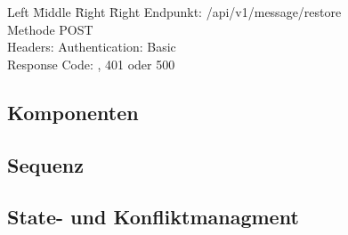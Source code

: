\begin{tabbing}
    Left \= Middle \= Right \= Right \kill
    Endpunkt:  \> \> \> /api/v1/message/restore\\
    Methode \>  \> \> POST\\
    Headers:  \> \>   \> Authentication: Basic\\
    Response Code:  \> \>  , 401 oder 500 \\
\end{tabbing}

\clearpage

\subsection{Komponenten}

\clearpage

\subsection{Sequenz}

\clearpage

\subsection{State- und Konfliktmanagment}

\clearpage

